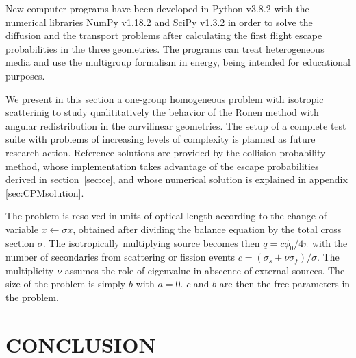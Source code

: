\documentclass{ictt26}
\begin{document}
New computer programs have been developed in Python v3.8.2 with the numerical libraries NumPy v1.18.2 and SciPy v1.3.2 in order to solve the diffusion and the transport problems after calculating the first flight escape probabilities in the three geometries. The programs can treat heterogeneous media and use the multigroup formalism in energy, being intended for educational purposes.

We present in this section a one-group homogeneous problem with isotropic scatterinig to study qualititatively the behavior of the Ronen method with angular redistribution in the curvilinear geometries. The setup of a complete test suite with problems of increasing levels of complexity is planned as future research action. Reference solutions are provided by the collision probability method, whose implementation takes advantage of the escape probabilities derived in section~\ref{sec:ce}, and whose numerical solution is explained in appendix \ref{sec:CPMsolution}.

The problem is resolved in units of optical length according to the change of variable $x \leftarrow \sigma x$, obtained after dividing the balance equation by the total cross section $\sigma$. The isotropically multiplying source becomes then $q = c \phi_0 / 4\pi$ with the number of secondaries from scattering or fission events $c = (\sigma_s + \nu \sigma_f)/\sigma$. The multiplicity $\nu$ assumes the role of eigenvalue in abscence of external sources. The size of the problem is simply $b$ with $a=0$. $c$ and $b$ are then the free parameters in the problem.



\section{CONCLUSION}
\label{sec:cncls}
\end{document}
